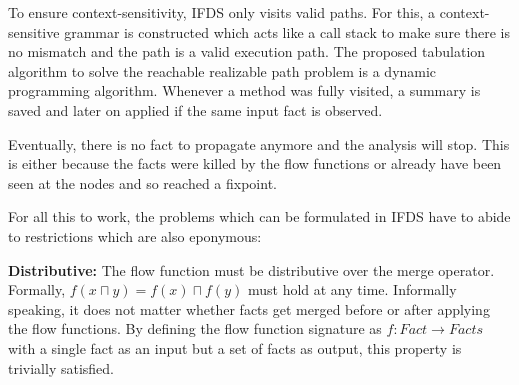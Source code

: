 \documentclass[../draft.tex]{subfiles}
\begin{document}
    To ensure context-sensitivity, IFDS only visits valid paths. For this, a context-sensitive grammar is constructed which acts like a call stack to make sure there is no mismatch and the path is a valid execution path.
    The proposed tabulation algorithm to solve the reachable realizable path problem is a dynamic programming algorithm. Whenever a method was fully visited, a summary is saved and later on applied if the same input fact is observed. 

    Eventually, there is no fact to propagate anymore and the analysis will stop. This is either because the facts were killed by the flow functions or already have been seen at the nodes and so reached a fixpoint.

    For all this to work, the problems which can be formulated in IFDS have to abide to restrictions which are also eponymous:

    \textbf{Distributive:} The flow function must be distributive over the merge operator. Formally, $f(x \sqcap y) = f(x) \sqcap f(y)$ must hold at any time. Informally speaking, it does not matter whether facts get merged before or after applying the flow functions. By defining the flow function signature as $f: \mathit{Fact} \rightarrow \mathit{Facts}$ with a single fact as an input but a set of facts as output, this property is trivially satisfied.
\end{document}
